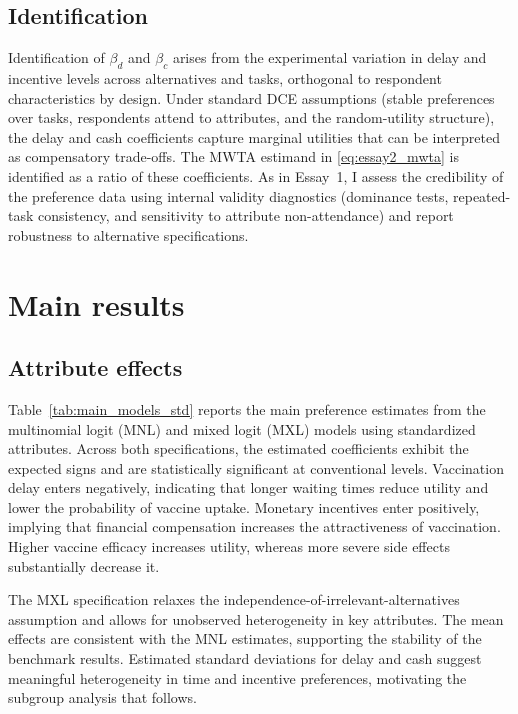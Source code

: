 \documentclass[doublespacing]{utdthesis}
\begin{document}
\subsection{Identification}
Identification of $\beta_d$ and $\beta_c$ arises from the experimental variation in delay and incentive levels across alternatives and tasks, orthogonal to respondent characteristics by design. Under standard DCE assumptions (stable preferences over tasks, respondents attend to attributes, and the random-utility structure), the delay and cash coefficients capture marginal utilities that can be interpreted as compensatory trade-offs. The MWTA estimand in \eqref{eq:essay2_mwta} is identified as a ratio of these coefficients. As in Essay~1, I assess the credibility of the preference data using internal validity diagnostics (dominance tests, repeated-task consistency, and sensitivity to attribute non-attendance) and report robustness to alternative specifications.

\section{Main results}
\label{sec:essay2_results}


\subsection{Attribute effects}
\label{subsec:essay2_attribute_effects}

Table~\ref{tab:main_models_std} reports the main preference estimates from the multinomial logit (MNL) and mixed logit (MXL) models using standardized attributes. Across both specifications, the estimated coefficients exhibit the expected signs and are statistically significant at conventional levels. Vaccination delay enters negatively, indicating that longer waiting times reduce utility and lower the probability of vaccine uptake. Monetary incentives enter positively, implying that financial compensation increases the attractiveness of vaccination. Higher vaccine efficacy increases utility, whereas more severe side effects substantially decrease it. 

The MXL specification relaxes the independence-of-irrelevant-alternatives assumption and allows for unobserved heterogeneity in key attributes. The mean effects are consistent with the MNL estimates, supporting the stability of the benchmark results. Estimated standard deviations for delay and cash suggest meaningful heterogeneity in time and incentive preferences, motivating the subgroup analysis that follows.
\end{document}
